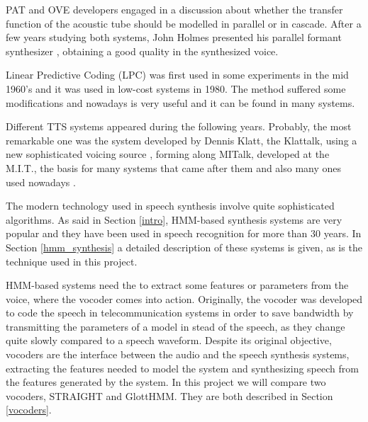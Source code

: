 PAT and OVE developers engaged in a discussion about whether the transfer function of the acoustic tube should be modelled in parallel or in cascade. After a few years studying both systems, John Holmes presented his parallel formant synthesizer \cite{Klatt87}, obtaining a good quality in the synthesized voice.

Linear Predictive Coding (LPC) was first used in some experiments in the mid 1960's \cite{Schroeder93} and it was used in low-cost systems in 1980. The method suffered some modifications and nowadays is very useful and it can be found in many systems. 

Different TTS systems appeared during the following years. Probably, the most remarkable one was the system developed by Dennis Klatt, the Klattalk, using a new sophisticated voicing source \cite{Klatt87}, forming along MITalk, developed at the M.I.T., the basis for many systems that came after them and also many ones used nowadays \cite{LemmettyMSc}.

The modern technology used in speech synthesis involve quite sophisticated algorithms. As said in Section \ref{intro}, HMM-based synthesis systems are very popular and they have been used in speech recognition for more than 30 years. In Section \ref{hmm_synthesis} a detailed description of these systems is given, as is the technique used in this project.

HMM-based systems need the to extract some features or parameters from the voice, where the vocoder comes into action. Originally, the vocoder was developed to code the speech in telecommunication systems in order to save bandwidth by transmitting the parameters of a model in stead of the speech, as they change quite slowly compared to a speech waveform. Despite its original objective, vocoders are the interface between the audio and the speech synthesis systems, extracting the features needed to model the system and synthesizing speech from the features generated by the system. In this project we will compare two vocoders, STRAIGHT and GlottHMM. They are both described in Section \ref{vocoders}. 
